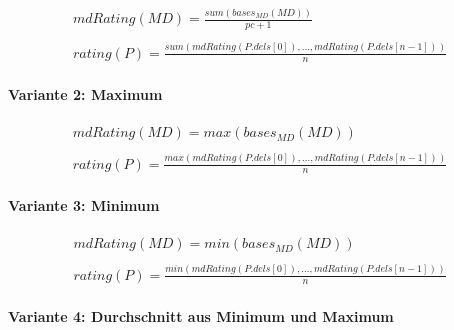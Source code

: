 \begin{gather*}
\mathit{mdRating(MD)} = \frac{\mathit{sum(bases_{MD}(MD))}}{\mathit{pc} + 1}
\\\\
\mathit{rating(P)} = \frac{ \mathit{sum(mdRating(P.dels[0]),...,mdRating(P.dels[n-1]))}}{n}
\end{gather*}



\paragraph{Variante 2: Maximum}

\begin{gather*}
\mathit{mdRating(MD)} = \mathit{max(bases_{MD}(MD))}
\\\\
\mathit{rating(P)} = \frac{\mathit{max(mdRating(P.dels[0]),...,mdRating(P.dels[n-1]))}}{n}
\end{gather*}



\paragraph{Variante 3: Minimum}

\begin{gather*}
\mathit{mdRating(MD)} = \mathit{min(bases_{MD}(MD))}
\\\\
\mathit{rating(P)} = \frac{\mathit{min(mdRating(P.dels[0]),...,mdRating(P.dels[n-1]))}}{n}
\end{gather*}

\paragraph{Variante 4: Durchschnitt aus Minimum und Maximum}

